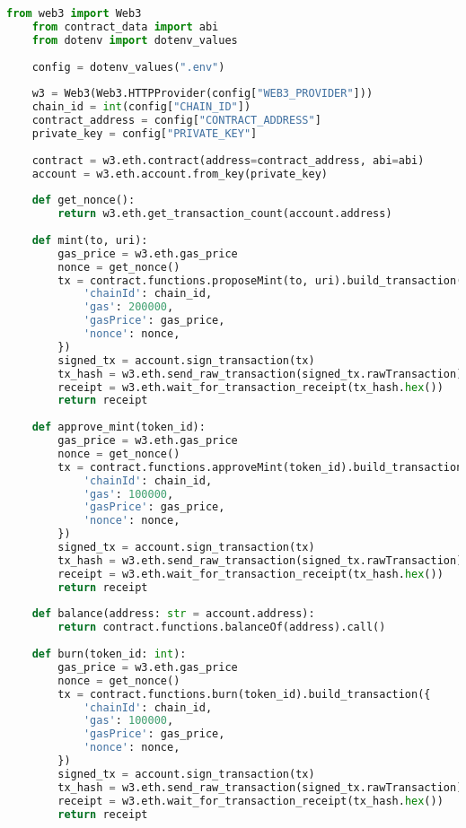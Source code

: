 \begin{lstlisting}[language=Python, caption=Тесты умного контракта]
    from web3 import Web3
    from contract_data import abi
    from dotenv import dotenv_values
    
    config = dotenv_values(".env")
    
    w3 = Web3(Web3.HTTPProvider(config["WEB3_PROVIDER"]))
    chain_id = int(config["CHAIN_ID"])
    contract_address = config["CONTRACT_ADDRESS"]
    private_key = config["PRIVATE_KEY"]
    
    contract = w3.eth.contract(address=contract_address, abi=abi)
    account = w3.eth.account.from_key(private_key)
    
    def get_nonce():
        return w3.eth.get_transaction_count(account.address)
    
    def mint(to, uri):
        gas_price = w3.eth.gas_price
        nonce = get_nonce()
        tx = contract.functions.proposeMint(to, uri).build_transaction({
            'chainId': chain_id,
            'gas': 200000,
            'gasPrice': gas_price,
            'nonce': nonce,
        })
        signed_tx = account.sign_transaction(tx)
        tx_hash = w3.eth.send_raw_transaction(signed_tx.rawTransaction)
        receipt = w3.eth.wait_for_transaction_receipt(tx_hash.hex())
        return receipt
    
    def approve_mint(token_id):
        gas_price = w3.eth.gas_price
        nonce = get_nonce()
        tx = contract.functions.approveMint(token_id).build_transaction({
            'chainId': chain_id,
            'gas': 100000,
            'gasPrice': gas_price,
            'nonce': nonce,
        })
        signed_tx = account.sign_transaction(tx)
        tx_hash = w3.eth.send_raw_transaction(signed_tx.rawTransaction)
        receipt = w3.eth.wait_for_transaction_receipt(tx_hash.hex())
        return receipt
    
    def balance(address: str = account.address):
        return contract.functions.balanceOf(address).call()
    
    def burn(token_id: int):
        gas_price = w3.eth.gas_price
        nonce = get_nonce()
        tx = contract.functions.burn(token_id).build_transaction({
            'chainId': chain_id,
            'gas': 100000,
            'gasPrice': gas_price,
            'nonce': nonce,
        })
        signed_tx = account.sign_transaction(tx)
        tx_hash = w3.eth.send_raw_transaction(signed_tx.rawTransaction)
        receipt = w3.eth.wait_for_transaction_receipt(tx_hash.hex())
        return receipt
    

\end{lstlisting}
